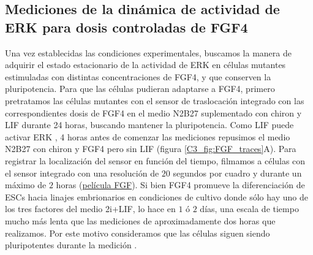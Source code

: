 \documentclass[./main.tex]{subfiles}
\begin{document}
\subsection{Mediciones de la dinámica de actividad de ERK para dosis controladas de FGF4}


Una vez establecidas las condiciones experimentales, buscamos la manera de adquirir el estado estacionario de la actividad de ERK en células mutantes estimuladas con distintas concentraciones de FGF4, y que conserven la pluripotencia. Para que las células pudieran adaptarse a FGF4, primero pretratamos las células mutantes con el sensor de traslocación integrado con las correspondientes dosis de FGF4 en el medio N2B27 suplementado con chiron y LIF durante 24 horas, buscando mantener la pluripotencia. Como LIF puede activar ERK \cite{Ohtsuka2015}, 4 horas antes de comenzar las mediciones repusimos el medio N2B27 con chiron y FGF4 pero sin LIF (figura \ref{C3_fig:FGF_traces}A). Para registrar la localización del sensor en función del tiempo, filmamos a células con el sensor integrado con una resolución de $20$ segundos por cuadro y durante un máximo de $2$ horas (\href{http://movie.biologists.com/video/10.1242/dev.199710/video-2}{película FGF}). Si bien FGF4 promueve la diferenciación de ESCs hacia linajes embrionarios en condiciones de cultivo donde sólo hay uno de los tres factores del medio 2i+LIF, lo hace en $1$ ó $2$ días, una escala de tiempo mucho más lenta que las mediciones de aproximadamente dos horas que realizamos. Por este motivo consideramos que las células siguen siendo pluripotentes durante la medición \cite{Kalkan2017}. 
\end{document}

